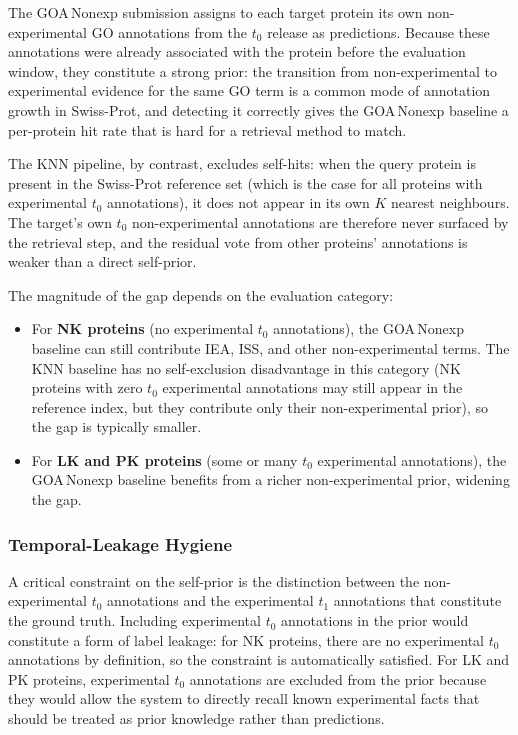 The GOA\,Nonexp submission assigns to each target protein its own non-experimental
GO annotations from the $t_0$ release as predictions. Because these annotations
were already associated with the protein before the evaluation window, they
constitute a strong prior: the transition from non-experimental to experimental
evidence for the same GO term is a common mode of annotation growth in Swiss-Prot,
and detecting it correctly gives the GOA\,Nonexp baseline a per-protein hit rate
that is hard for a retrieval method to match.

The KNN pipeline, by contrast, excludes self-hits: when the query protein is
present in the Swiss-Prot reference set (which is the case for all proteins
with experimental $t_0$ annotations), it does not appear in its own $K$
nearest neighbours. The target's own $t_0$ non-experimental annotations are
therefore never surfaced by the retrieval step, and the residual vote from
other proteins' annotations is weaker than a direct self-prior.

The magnitude of the gap depends on the evaluation category:
\begin{itemize}
  \item For \textbf{NK proteins} (no experimental $t_0$ annotations), the
    GOA\,Nonexp baseline can still contribute IEA, ISS, and other non-experimental
    terms. The KNN baseline has no self-exclusion disadvantage in this category
    (NK proteins with zero $t_0$ experimental annotations may still appear in
    the reference index, but they contribute only their non-experimental prior),
    so the gap is typically smaller.
  \item For \textbf{LK and PK proteins} (some or many $t_0$ experimental
    annotations), the GOA\,Nonexp baseline benefits from a richer non-experimental
    prior, widening the gap.
\end{itemize}

\subsubsection{Temporal-Leakage Hygiene}

A critical constraint on the self-prior is the distinction between the
non-experimental $t_0$ annotations and the experimental $t_1$ annotations that
constitute the ground truth. Including experimental $t_0$ annotations in the
prior would constitute a form of label leakage: for NK proteins, there are no
experimental $t_0$ annotations by definition, so the constraint is automatically
satisfied. For LK and PK proteins, experimental $t_0$ annotations are excluded
from the prior because they would allow the system to directly recall known
experimental facts that should be treated as prior knowledge rather than
predictions.

